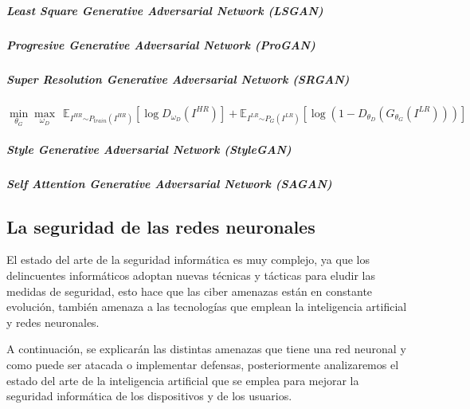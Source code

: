 \subparagraph*{Least Square Generative Adversarial Network (LSGAN)}

\subparagraph*{Progresive Generative Adversarial Network (ProGAN)}

\subparagraph*{Super Resolution Generative Adversarial Network (SRGAN)}

\begin{equation}
    \min_{\theta_{G}} \max_{\omega_{D}}~~\mathbb{E}_{I^{H R} {\sim P_{train} (I^{H R})}} \left[ \log D_{\omega_{D}}(I^{H R}) \right] + \mathbb{E}_{I^{L R} {\sim P_{G} (I^{L R})}} \left[ \log( 1 - D_{\theta_{D}}(G_{\theta_{G}}(I^{L R}))) \right]
\end{equation}

\subparagraph*{Style Generative Adversarial Network (StyleGAN)}

\subparagraph*{Self Attention Generative Adversarial Network (SAGAN)}




\subsection{La seguridad de las redes neuronales}
\label{ch:2:section:state-of-the-art:computer-security-in-neural-networks}


El estado del arte de la seguridad informática es muy complejo, ya que los delincuentes informáticos adoptan nuevas técnicas y tácticas para eludir las medidas de seguridad, esto hace que las ciber amenazas están en constante evolución, también amenaza a las tecnologías que emplean la inteligencia artificial y redes neuronales.

A continuación, se explicarán las distintas amenazas que tiene una red neuronal y como puede ser atacada o implementar defensas, posteriormente analizaremos el estado del arte de la inteligencia artificial que se emplea para mejorar la seguridad informática de los dispositivos y de los usuarios.

